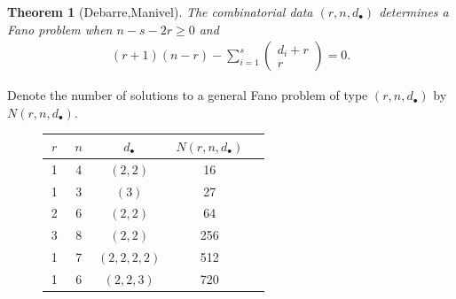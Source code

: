 \documentclass[final]{beamer}
\theoremstyle{thrm}
\newtheorem{thm}{Theorem}
\begin{document}
\begin{frame}
\begin{minipage}[t]{.3\textwidth}
\vspace{-.5cm}

\begin{thm}[\raisebox{-.1cm}{\,}Debarre,Manivel\raisebox{.9cm}{\,}]
\vspace{.2cm}
The combinatorial data $(r,n,d_\bullet)$ determines a Fano problem when $n-s-2r\ge 0$ and
\begin{align*}
(r+1)(n-r) - \sum_{i=1}^s \begin{pmatrix}d_i + r\\r\end{pmatrix}=0.
\end{align*}
\vspace{.1cm}
\end{thm}

\vspace{-.2cm}


Denote the number of solutions to a general Fano problem of type $(r,n,d_\bullet)$ by $N(r,n,d_\bullet)$.


\begin{figure}
\begin{minipage}{.99\textwidth}
\begin{table}[htb]
  \label{Small Fano}
  \def\arraystretch{1.2}
  \begin{tabular}{||c|c|c|c|c||}
    \hline
    $~r~$ & $~n~$ & $~d_\bullet~$ & $~N(r,n,d_\bullet)~$\\
    \hline\hline
    1 & 4 & $(2,2)$ & 16\\
    \hline
    1 & 3 & $(3)$ & 27\\
    \hline
    2 & 6 & $(2,2)$ & 64\\
    \hline
    3 & 8 & $(2,2)$ & 256\\
    \hline
    1 & 7 & $(2,2,2,2)$ & 512\\
    \hline
    1 & 6 & $(2,2,3)$ & 720\\
    \hline
  \end{tabular}
\end{table}
\end{minipage}


\end{figure}
\end{minipage}
\end{frame}
\end{document}
